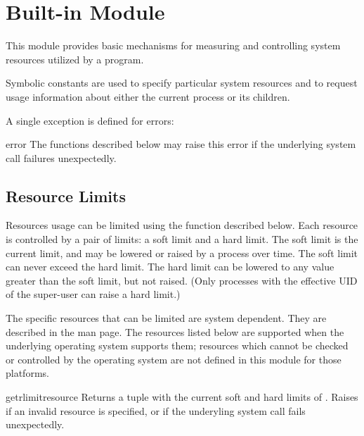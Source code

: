 \section{Built-in Module }
\label{module-resource}

This module provides basic mechanisms for measuring and controlling
system resources utilized by a program.

Symbolic constants are used to specify particular system resources and
to request usage information about either the current process or its
children.

A single exception is defined for errors:


\begin{excdesc}{error}
  The functions described below may raise this error if the underlying
  system call failures unexpectedly.
\end{excdesc}

\subsection{Resource Limits}

Resources usage can be limited using the  function
described below. Each resource is controlled by a pair of limits: a
soft limit and a hard limit. The soft limit is the current limit, and
may be lowered or raised by a process over time. The soft limit can
never exceed the hard limit. The hard limit can be lowered to any
value greater than the soft limit, but not raised. (Only processes with
the effective UID of the super-user can raise a hard limit.)

The specific resources that can be limited are system dependent. They
are described in the  man page.  The resources
listed below are supported when the underlying operating system
supports them; resources which cannot be checked or controlled by the
operating system are not defined in this module for those platforms.

\begin{funcdesc}{getrlimit}{resource}
  Returns a tuple  with the current
  soft and hard limits of . Raises  if
  an invalid resource is specified, or  if the
  underyling system call fails unexpectedly.
\end{funcdesc}

